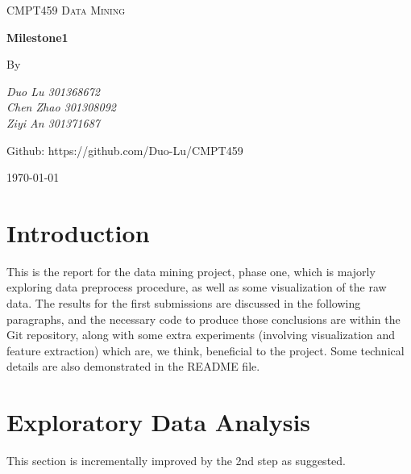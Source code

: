 \documentclass[12pt,twocolumn,letterpaper]{article}
\begin{document}
\begin{titlepage}
	\centering
	\setlength{\headsep}{15pt}
	{\scshape\huge CMPT459 Data Mining\\\par}
	\vspace{4cm}
	{\LARGE \bf Milestone1\par}
	\vspace{3cm}
	
	\vfill
	{By\\\par
	\vspace{0.3cm}
	\itshape Duo Lu 301368672\\
	\vspace{0.3cm}
	\itshape Chen Zhao 301308092\\
	\vspace{0.3cm}
	\itshape Ziyi An 301371687\\\par}
	
	
	\vfill

    Github: https://github.com/Duo-Lu/CMPT459\\
	{\large \today\par}
\end{titlepage}


\section{Introduction}
This is the report for the data mining project, phase one, which is majorly exploring data preprocess procedure, as well as some visualization of the raw data. The results for the first submissions are discussed in the following paragraphs, and the necessary code to produce those conclusions are within the Git repository, along with some extra experiments (involving visualization and feature extraction) which are, we think, beneficial to the project. Some technical details are also demonstrated in the README file.


\section{Exploratory Data Analysis}
This section is incrementally improved by the 2nd step as suggested. 
\end{document}
